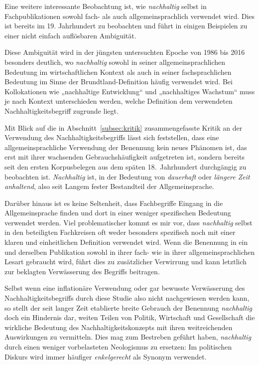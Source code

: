 \documentclass[
    german,
    a4paper,%
    12pt,%
    oneside,%
    toc=bibliography,
    final,
]{scrartcl}
\begin{document}
Eine weitere interessante Beobachtung ist, wie \textit{nachhaltig} selbst in Fachpublikationen sowohl fach- als auch allgemeinsprachlich verwendet wird. Dies ist bereits im 19. Jahrhundert zu beobachten und führt in einigen Beispielen zu einer nicht einfach auflösbaren Ambiguität.

Diese Ambiguität wird in der jüngsten untersuchten Epoche von 1986 bis 2016 besonders deutlich, wo \textit{nachhaltig} sowohl in seiner allgemeinsprachlichen Bedeutung im wirtschaftlichen Kontext als auch in seiner fachsprachlichen Bedeutung im Sinne der Brundtland-Definition häufig verwendet wird. Bei Kollokationen wie „nachhaltige Entwicklung“ und „nachhaltiges Wachstum“ muss je nach Kontext unterschieden werden, welche Definition dem verwendeten Nachhaltigkeitsbegriff zugrunde liegt.

Mit Blick auf die in Abschnitt~\ref{subsec:kritik} zusammengefasste Kritik an der Verwendung des Nachhaltigkeitsbegriffs lässt sich feststellen, dass eine allgemeinsprachliche Verwendung der Benennung kein neues Phänomen ist, das erst mit ihrer wachsenden Gebrauchshäufigkeit aufgetreten ist, sondern bereits seit den ersten Korpusbelegen aus dem späten 18.~Jahrhundert durchgängig zu beobachten ist. \textit{Nachhaltig} ist, in der Bedeutung von \textit{dauerhaft} oder \textit{längere Zeit anhaltend}, also seit Langem fester Bestandteil der Allgemeinsprache.

Darüber hinaus ist es keine Seltenheit, dass Fachbegriffe Eingang in die Allgemeinsprache finden und dort in einer weniger spezifischen Bedeutung verwendet werden. Viel problematischer kommt es mir vor, dass \textit{nachhaltig} selbst in den beteiligten Fachkreisen oft weder besonders spezifisch noch mit einer klaren und einheitlichen Definition verwendet wird. Wenn die Benennung in ein und derselben Publikation sowohl in ihrer fach- wie in ihrer allgemeinsprachlichen Lesart gebraucht wird, führt dies zu zusätzlicher Verwirrung und kann letztlich zur beklagten Verwässerung des Begriffs beitragen.

Selbst wenn eine inflationäre Verwendung oder gar bewusste Verwässerung des Nachhaltigkeitsbegriffs durch diese Studie also nicht nachgewiesen werden kann, so stellt der seit langer Zeit etablierte breite Gebrauch der Benennung \textit{nachhaltig} doch ein Hindernis dar, weiten Teilen von Politik, Wirtschaft und Gesellschaft die wirkliche Bedeutung des Nachhaltigkeitskonzepts mit ihren weitreichenden Auswirkungen zu vermitteln. Dies mag zum Bestreben geführt haben, \textit{nachhaltig} durch einen weniger vorbelasteten Neologismus zu ersetzen: Im politischen Diskurs wird immer häufiger \textit{enkelgerecht} als Synonym verwendet.
\end{document}
